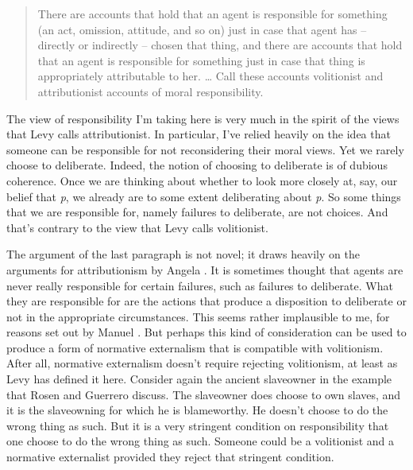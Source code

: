 \begin{quote}
There are accounts that hold that an agent is responsible for something (an act, omission, attitude, and so on) just in case that agent has – directly or indirectly – chosen that thing, and there are accounts that hold that an agent is responsible for something just in case that thing is appropriately attributable to her. {\ldots} Call these accounts volitionist and attributionist accounts of moral responsibility. ~\citep[2]{Levy2005}
\end{quote}
The view of responsibility I'm taking here is very much in the spirit of the views that Levy calls attributionist. In particular, I've relied heavily on the idea that someone can be responsible for not reconsidering their moral views. Yet we rarely choose to deliberate. Indeed, the notion of choosing to deliberate is of dubious coherence. Once we are thinking about whether to look more closely at, say, our belief that \emph{p}, we already are to some extent deliberating about \emph{p}. So some things that we are responsible for, namely failures to deliberate, are not choices. And that's contrary to the view that Levy calls volitionist.

The argument of the last paragraph is not novel; it draws heavily on the arguments for attributionism by Angela \citet{AngelaSmith2005}. It is sometimes thought that agents are never really responsible for certain failures, such as failures to deliberate. What they are responsible for are the actions that produce a disposition to deliberate or not in the appropriate circumstances. This seems rather implausible to me, for reasons set out by Manuel \citet{Vargas2005}. But perhaps this kind of consideration can be used to produce a form of normative externalism that is compatible with volitionism. After all, normative externalism doesn't require rejecting volitionism, at least as Levy has defined it here. Consider again the ancient slaveowner in the example that Rosen and Guerrero discuss. The slaveowner does choose to own slaves, and it is the slaveowning for which he is blameworthy. He doesn't choose to do the wrong thing as such. But it is a very stringent condition on responsibility that one choose to do the wrong thing as such. Someone could be a volitionist and a normative externalist provided they reject that stringent condition.

